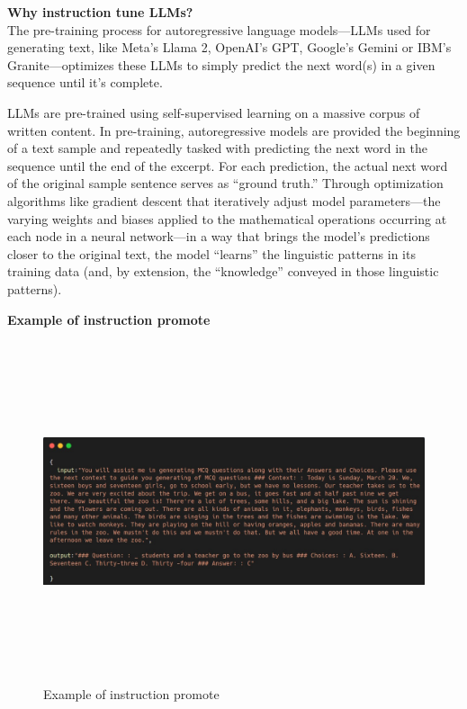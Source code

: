 \hfill \break
\textbf{Why instruction tune LLMs?} \\
\hfill \break
The pre-training process for autoregressive language models—LLMs used for generating text, like Meta’s Llama 2, OpenAI’s GPT, Google’s Gemini or IBM’s Granite—optimizes these LLMs to simply predict the next word(s) in a given sequence until it’s complete.

\hfill \break
LLMs are pre-trained using self-supervised learning on a massive corpus of written content. In pre-training, autoregressive models are provided the beginning of a text sample and repeatedly tasked with predicting the next word in the sequence until the end of the excerpt. For each prediction, the actual next word of the original sample sentence serves as “ground truth.” Through optimization algorithms like gradient descent that iteratively adjust model parameters—the varying weights and biases applied to the mathematical operations occurring at each node in a neural network—in a way that brings the model’s predictions closer to the original text, the model “learns” the linguistic patterns in its training data (and, by extension, the “knowledge” conveyed in those linguistic patterns).

\hfill \break
\textbf{Example of instruction promote} \\

\begin{center}
\begin{figure}[h!]
\centering
\includegraphics[scale=0.5,width=20.75cm,height=10cm, center]{figures/instruction dataset.png}
\caption{ Example of instruction promote }
\end{figure}
\end{center}

